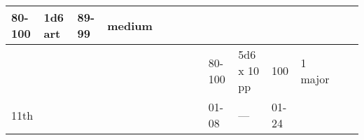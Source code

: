 \begin{longtable}{llllllllllllll}
{\begin{minipage}[t]{0.923in}
80-100\end{minipage}} & \multicolumn{1}{p{0.469in}|}{\begin{minipage}[t]{0.469in}\raggedright
1d6 art\end{minipage}} & \multicolumn{1}{p{0.626in}|}{\begin{minipage}[t]{0.626in}\raggedright
89-99\end{minipage}} & \multicolumn{1}{p{0.469in}|}{\begin{minipage}[t]{0.469in}\centering
1 medium\end{minipage}}\\
\hline
\multicolumn{8}{p{1.150in}|}{\begin{minipage}[t]{1.150in}\centering
\end{minipage}} & \multicolumn{1}{|p{0.393in}|}{\begin{minipage}[t]{0.393in}\raggedright
80-100\end{minipage}} & \multicolumn{1}{p{0.469in}|}{\begin{minipage}[t]{0.469in}\raggedright
5d6 x 10 pp\end{minipage}} & \multicolumn{1}{p{0.923in}|}{\begin{minipage}[t]{0.923in}\raggedright
100\end{minipage}} & \multicolumn{1}{p{0.469in}|}{\begin{minipage}[t]{0.469in}\raggedright
1 major\end{minipage}} & \multicolumn{1}{p{0.626in}|}{\begin{minipage}[t]{0.626in}\raggedright
\end{minipage}} & \multicolumn{1}{p{0.469in}|}{\begin{minipage}[t]{0.469in}\centering
\end{minipage}}\\
\hline
\multicolumn{8}{p{1.150in}|}{\begin{minipage}[t]{1.150in}\centering
11th\end{minipage}} & \multicolumn{1}{|p{0.393in}|}{\begin{minipage}[t]{0.393in}\raggedright
01-08\end{minipage}} & \multicolumn{1}{p{0.469in}|}{\begin{minipage}[t]{0.469in}\raggedright
---\end{minipage}} & \multicolumn{1}{p{0.923in}|}{\begin{minipage}[t]{0.923in}\raggedright
01-24\end{minipage}} & \multicolumn{1}{p{0.469in}|}{\begin{minipage}[t]{0.469in}\raggedright

\end{minipage}}
\end{longtable}
